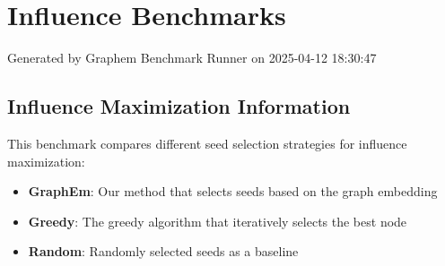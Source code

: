 \documentclass{article}
\begin{document}
\section*{Influence Benchmarks}
Generated by Graphem Benchmark Runner on 2025-04-12 18:30:47
\subsection*{Influence Maximization Information}
This benchmark compares different seed selection strategies for influence maximization:
\begin{itemize}
\item \textbf{GraphEm}: Our method that selects seeds based on the graph embedding
\item \textbf{Greedy}: The greedy algorithm that iteratively selects the best node
\item \textbf{Random}: Randomly selected seeds as a baseline
\end{itemize}
\end{document}
